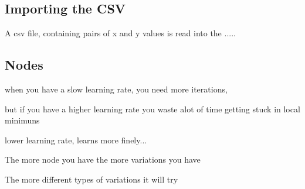 \documentclass[a4paper, 10pt]{IEEEconf}
\begin{document}
\subsection{Importing the CSV}

A csv file, containing pairs of x and y values is read into the .....




%
%

\subsection{Nodes}

when you have a slow learning rate, you need more iterations, 

but if you have a higher learning rate you waste alot of time getting stuck in local minimuns

lower learning rate, learns more finely...

The more node you have the more variations you have

The more different types of variations it will try
\end{document}
